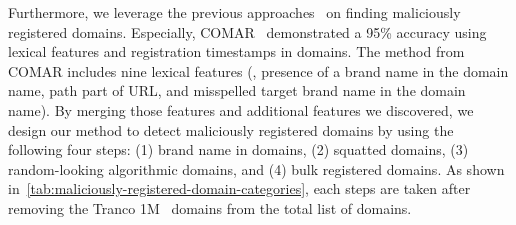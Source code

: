 Furthermore, we leverage the previous approaches~\cite{maroofi2020comar,Phishing18:online,de2021compromised,canali2013role,hao2016predator} on finding maliciously registered domains.
Especially, COMAR~\cite{CompareP38:online} demonstrated a 95\% accuracy using lexical features and registration timestamps in domains.
The method from COMAR includes nine lexical features (\ie, presence of a brand name in the domain name, path part of URL, and misspelled target brand name in the domain name).
By merging those features and additional features we discovered, we design our method to detect maliciously registered domains by using the following four steps: (1) brand name in domains, (2) squatted domains, (3) random-looking algorithmic domains, and (4) bulk registered domains.
As shown in~\autoref{tab:maliciously-registered-domain-categories}, each steps are taken after removing the Tranco 1M~\cite{Aresearc32:online} domains from the total list of domains.
% 



